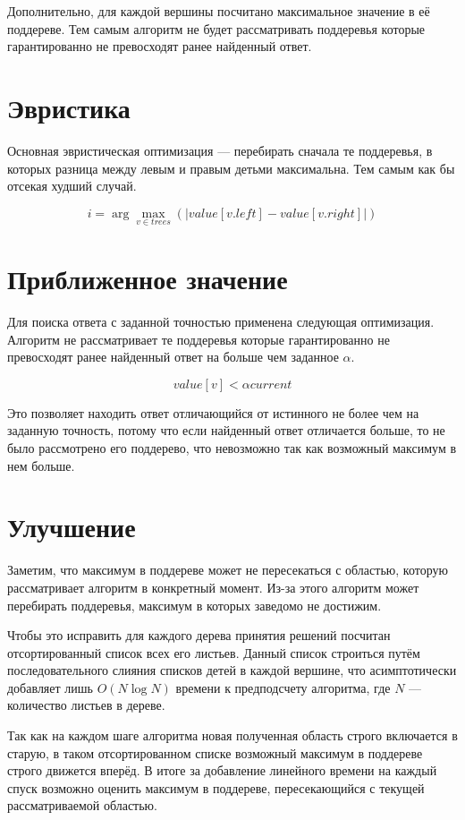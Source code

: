 \documentclass[pscyr,specification,annotation]{itmo-student-thesis}
\begin{document}
Дополнительно, для каждой вершины посчитано максимальное значение в её
поддереве. Тем самым алгоритм не будет рассматривать поддеревья которые
гарантированно не превосходят ранее найденный ответ.

\section{Эвристика}
Основная эвристическая оптимизация --- перебирать сначала те поддеревья,
в которых разница между левым и правым детьми максимальна. Тем самым как бы
отсекая худший случай.

\[
    i = \arg \max_{v \in trees}(|value[v.left] - value[v.right]|)
\]

\section{Приближенное значение}
Для поиска ответа с заданной точностью применена следующая оптимизация. Алгоритм
не рассматривает те поддеревья которые гарантированно не превосходят ранее
найденный ответ на больше чем заданное $\alpha$.

\[
    value[v] < \alpha current
\]

Это позволяет находить ответ отличающийся от истинного не более чем на заданную
точность, потому что если найденный ответ отличается больше, то не было
рассмотрено его поддерево, что невозможно так как возможный максимум в нем
больше.

\section{Улучшение}

Заметим, что максимум в поддереве может не пересекаться с областью, которую
рассматривает алгоритм в конкретный момент. Из-за этого алгоритм может
перебирать поддеревья, максимум в которых заведомо не достижим.

Чтобы это исправить для каждого дерева принятия решений посчитан отсортированный
список всех его листьев. Данный список строиться путём последовательного слияния
списков детей в каждой вершине, что асимптотически добавляет лишь $O(N \log{N})$
времени к предподсчету алгоритма, где $N$ --- количество листьев в дереве.

Так как на каждом шаге алгоритма новая полученная область строго включается
в старую, в таком отсортированном списке возможный максимум в поддереве строго
движется вперёд. В итоге за добавление линейного времени на каждый спуск
возможно оценить максимум в поддереве, пересекающийся с текущей рассматриваемой
областью.
\end{document}
